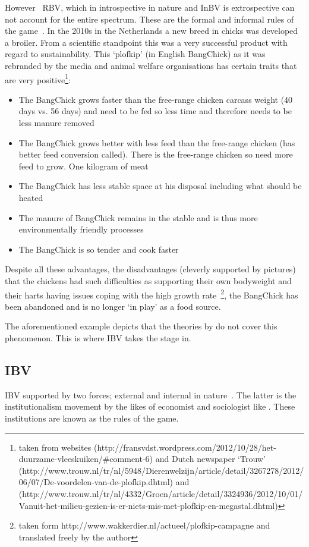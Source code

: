 However ~\gls{RBV}, which in introspective in nature and \gls{InBV} is extrospective can not account for the entire spectrum. These are the formal and informal rules of the game~\cite{North:1990}. In the 2010s in the Netherlands a new breed in chicks was developed a broiler. From a scientific standpoint this was a very successful product with regard to sustainability. 
This `plofkip' (in English BangChick) as it was rebranded by the media and animal welfare organisations has certain traits that are very positive\footnote{taken from websites (http://fransvdst.wordpress.com/2012/10/28/het-duurzame-vleeskuiken/#comment-6) and  Dutch newspaper `Trouw' (http://www.trouw.nl/tr/nl/5948/Dierenwelzijn/article/detail/3267278/2012/06/07/De-voordelen-van-de-plofkip.dhtml) and (http://www.trouw.nl/tr/nl/4332/Groen/article/detail/3324936/2012/10/01/Vanuit-het-milieu-gezien-is-er-niets-mis-met-plofkip-en-megastal.dhtml)}:

\begin{itemize}
\item The BangChick grows faster than the free-range chicken carcass weight (40 days vs. 56 days) and need to be fed so less time and therefore needs to be less manure removed
 \item    The BangChick grows better with less feed than the free-range chicken (has better feed conversion called). There is the free-range chicken so need more feed to grow. One kilogram of meat
\item     The BangChick has less stable space at his disposal including what should be heated
\item     The manure of BangChick remains in the stable and is thus more environmentally friendly processes
  \item   The BangChick is so tender and cook faster
\end{itemize}

Despite all these advantages, the disadvantages (cleverly supported by pictures) that the chickens had such difficulties as supporting their own bodyweight and their harts having issues coping with the high growth rate~\footnote{taken form http://www.wakkerdier.nl/actueel/plofkip-campagne and translated freely by the author}, the BangChick has been abandoned and is no longer `in play' as a food source.

The aforementioned example depicts that the theories by \cite{Porter:1980,Barney:1991} do not cover this phenomenon. This is where \gls{IBV} takes the stage in.  

\subsection{\gls{IBV}}
IBV supported by two forces; external and internal in nature~\cite{Peng:2009}. The latter is the institutionalism movement by the likes of economist \cite{North:1990} and sociologist like \cite{DiMaggio:1983,Scott:1995}. These institutions are known as the rules of the game. 

